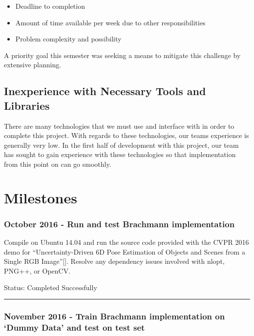 \documentclass[12pt]{article}
\begin{document}
\begin{itemize}
\item
  Deadline to completion
\item
  Amount of time available per week due to other responsibilities
\item
  Problem complexity and possibility
\end{itemize}

A priority goal this semester was seeking a means to mitigate this
challenge by extensive planning.

\subsection{Inexperience with Necessary Tools and
Libraries}\label{inexperience-with-necessary-tools-and-libraries}

There are many technologies that we must use and interface with in order
to complete this project. With regards to these technologies, our teams
experience is generally very low. In the first half of development with
this project, our team has sought to gain experience with these
technologies so that implementation from this point on can go smoothly.

\section{Milestones}\label{milestones}

\subsubsection{October 2016 - Run and test Brachmann
implementation}\label{october-2016---run-and-test-brachmann-implementation}

Compile on Ubuntu 14.04 and run the source code provided with the CVPR
2016 demo for ``Uncertainty-Driven 6D Pose Estimation of Objects and
Scenes from a Single RGB Image''{[}{]}. Resolve any dependency issues
involved with nlopt, PNG++, or OpenCV.

Status: Completed Successfully

\begin{center}\rule{0.5\linewidth}{\linethickness}\end{center}

\subsubsection{\texorpdfstring{November 2016 - Train Brachmann
implementation on `Dummy Data' and test on test
set}{November 2016 - Train Brachmann implementation on Dummy Data and test on test set}}\label{november-2016---train-brachmann-implementation-on-dummy-data-and-test-on-test-set}
\end{document}
